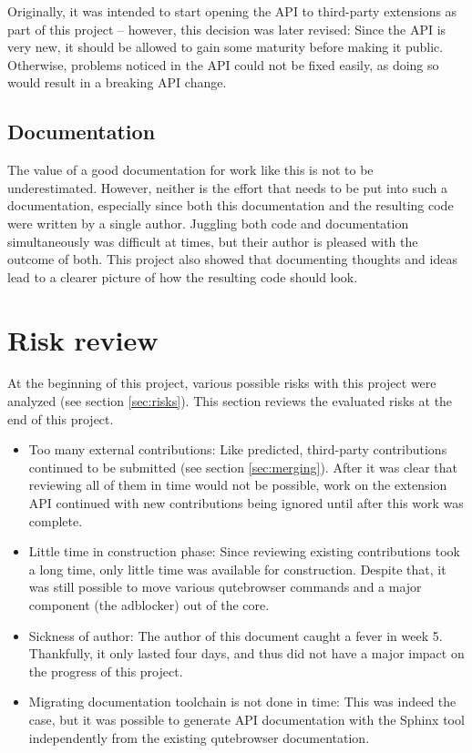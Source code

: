 Originally, it was intended to start opening the API to third-party extensions
as part of this project -- however, this decision was later revised: Since the
API is very new, it should be allowed to gain some maturity before making it
public. Otherwise, problems noticed in the API could not be fixed easily, as
doing so would result in a breaking API change.

\subsection{Documentation}

The value of a good documentation for work like this is not to be
underestimated. However, neither is the effort that needs to be put into such a
documentation, especially since both this documentation and the resulting code
were written by a single author. Juggling both code and documentation
simultaneously was difficult at times, but their author is pleased with the
outcome of both. This project also showed that documenting thoughts and ideas
lead to a clearer picture of how the resulting code should look.

\section{Risk review}
At the beginning of this project, various possible risks with this project were
analyzed (see section \ref{sec:risks}). This section reviews the evaluated
risks at the end of this project.

\begin{itemize}
  \item Too many external contributions: Like predicted, third-party
    contributions continued to be submitted (see section \ref{sec:merging}).
    After it was clear that reviewing all of them in time would not be possible,
    work on the extension API continued with new contributions being ignored
    until after this work was complete.
  \item Little time in construction phase: Since reviewing existing
    contributions took a long time, only little time was available for
    construction. Despite that, it was still possible to move various
    qutebrowser commands and a major component (the adblocker) out of the core.
  \item Sickness of author: The author of this document caught a fever in week
    5. Thankfully, it only lasted four days, and thus did not have a major
    impact on the progress of this project.
  \item Migrating documentation toolchain is not done in time: This was indeed
    the case, but it was possible to generate API documentation with the Sphinx
    tool independently from the existing qutebrowser documentation.
\end{itemize}

